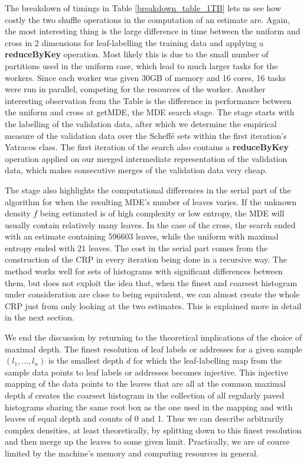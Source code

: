\documentclass{report}
\begin{document}
The breakdown of timings in Table \ref{breakdown_table_1TB} lets us see how costly the two shuffle operations in the computation of an estimate are. 
Again, the most interesting thing is the large difference in time between the uniform and cross in 2 dimensions for leaf-labelling the training data and applying a \textbf{reduceByKey} operation.
Most likely this is due to the small number of partitions used in the uniform case, which lead to much
larger tasks for the workers. Since each worker was given 30GB of memory and 16 cores,
16 tasks were run in parallel, competing for the resources of the worker. Another interesting observation from the Table is the difference in performance between the
uniform and cross at getMDE, the MDE search stage. The stage starts with the labelling of the validation data, after which we determine the empirical measure of the validation
data over the Scheffé sets within the first iteration's Yatracos class. The first iteration of the search also contains a \textbf{reduceByKey} operation applied on our merged intermediate representation of 
the validation data, which makes consecutive merges of the validation data very cheap. 

The stage also highlights the computational differences in the serial part of the algorithm for when the 
resulting MDE's number of leaves varies. If the unknown density $f$ being estimated is of high complexity or low entropy,
the MDE will usually contain relatively many leaves.
In the case of the cross, the search ended with an estimate containing 596603 leaves, while the uniform with maximal entropy ended with 21 leaves. The cost in the serial part comes from the construction of the
CRP in every iteration being done in a recursive way. The method works well for sets of histograms with significant differences between them, but does not exploit the idea that,
when the finest and coarsest histogram under consideration are close to being equivalent, we can almost create the whole CRP just from only looking at the two estimates. This is explained more in detail
in the next section.

We end the discussion by returning to the theoretical implications of the choice of maximal depth. The finest resolution of leaf labels or addresses for a given sample $(l_1,\dots,l_n)$ is the smallest depth $d$ for which the leaf-labelling map from the sample data points to leaf labels or addresses becomes injective.
This injective mapping of the data points to the leaves that are all at the common maximal depth $d$ creates the coarsest histogram in the collection of all regularly
paved histograms sharing the same root box as the one used in the mapping and 
with leaves of equal depth and counts of 0 and 1.
Thus we can describe arbitrarily complex densities, at least theoretically, by splitting down to this finest resolution and then merge up the leaves to some given limit. Practically, we are of course limited by the machine's memory and computing resources in general.
\end{document}
